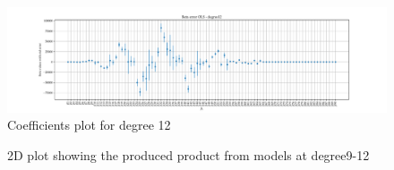 \documentclass[11pt, a4paper]{article}
\begin{document}
\begin{figure}
  \centering
  \hspace*{-4.2cm}
  \includegraphics[scale=0.52]{figures/EX6_EX1_OLS_beta_error_degree12.pdf}
  \caption{Coefficients plot for degree 12}
  \label{fig:EX6_1_OLS_betas_plot_degree12}
\end{figure}


\begin{figure}
  \centering
  \caption{2D plot showing the produced product from models at degree9-12}
  \hspace*{-1.2cm}

\end{figure}
\end{document}
